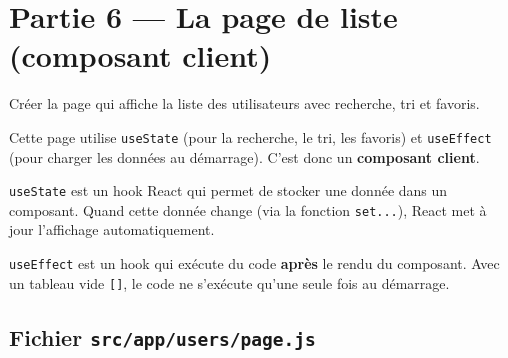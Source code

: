 \documentclass[11pt,a4paper]{article}
\begin{document}
\section{Partie 6 --- La page de liste (composant client)}

\begin{objectifbox}
Créer la page qui affiche la liste des utilisateurs avec recherche, tri et favoris.
\end{objectifbox}

Cette page utilise \texttt{useState} (pour la recherche, le tri, les favoris) et \texttt{useEffect} (pour charger les données au démarrage). C'est donc un \textbf{composant client}.

\texttt{useState} est un hook React qui permet de stocker une donnée dans un composant. Quand cette donnée change (via la fonction \texttt{set...}), React met à jour l'affichage automatiquement.

\texttt{useEffect} est un hook qui exécute du code \textbf{après} le rendu du composant. Avec un tableau vide \texttt{[]}, le code ne s'exécute qu'une seule fois au démarrage.

\subsection{Fichier \texttt{src/app/users/page.js}}
\end{document}

